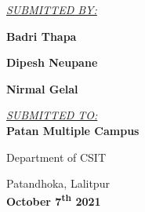 \documentclass[12pt]{report}
\newcommand{\sigline}[1]{\makebox[\widthof{#1~}]{.\dotfill}\\#1}
\begin{document}
\begin{center}
    \begin{large}
        \underline{\emph{SUBMITTED BY:}}

        \textbf{Badri Thapa}

        \textbf{Dipesh Neupane}

        \textbf{Nirmal Gelal}\\[1.2cm]
    \end{large}

    \begin{large}
    \underline{\emph{SUBMITTED TO:}}\\[0.13cm]

    \textbf{Patan Multiple Campus}
    \end{large}

    \begin{large}
    Department of CSIT



    \end{large}
    Patandhoka, Lalitpur\\[1cm]
    \textbf{October 7\textsuperscript{th} 2021}
    \end{center}
    \newpage





\end{document}
